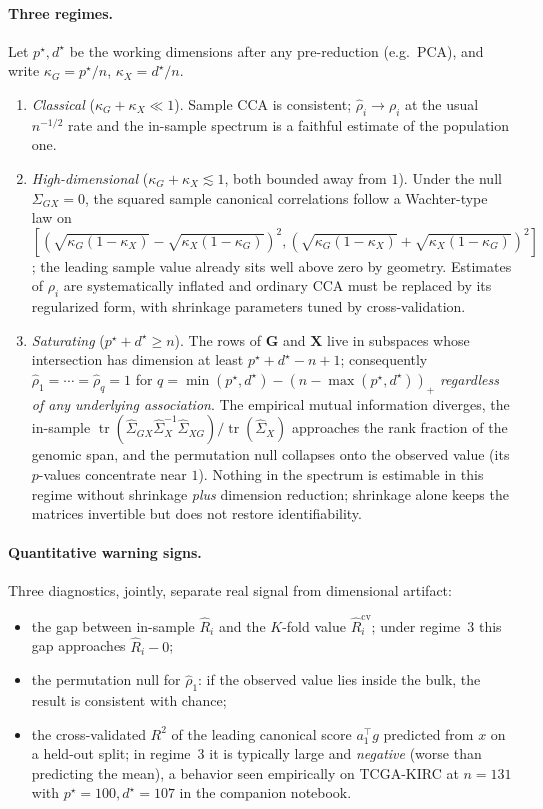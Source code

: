 \documentclass{article}
\newcommand{\tr}{\operatorname{tr}}
\newcommand{\Sx}{\Sigma_{X}}
\newcommand{\Sgx}{\Sigma_{GX}}
\newcommand{\Sxg}{\Sigma_{XG}}
\newcommand{\T}{^{\top}}
\begin{document}
\paragraph{Three regimes.} Let $p^\star, d^\star$ be the working dimensions
after any pre-reduction (e.g.\ PCA), and write $\kappa_G = p^\star/n$,
$\kappa_X = d^\star/n$.
\begin{enumerate}
\item \emph{Classical} ($\kappa_G + \kappa_X \ll 1$). Sample CCA is consistent;
$\hat\rho_i \to \rho_i$ at the usual $n^{-1/2}$ rate and the in-sample spectrum
is a faithful estimate of the population one.
\item \emph{High-dimensional} ($\kappa_G + \kappa_X \lesssim 1$, both bounded
away from $1$). Under the null $\Sgx = 0$, the squared sample canonical
correlations follow a Wachter-type law on
$[(\sqrt{\kappa_G(1-\kappa_X)} - \sqrt{\kappa_X(1-\kappa_G)})^2,
 (\sqrt{\kappa_G(1-\kappa_X)} + \sqrt{\kappa_X(1-\kappa_G)})^2]$
\citep{wachter1980limiting,yang2015independence}; the leading sample value already sits well
above zero by geometry. Estimates of $\rho_i$ are systematically inflated and
ordinary CCA must be replaced by its regularized form, with shrinkage
parameters tuned by cross-validation.
\item \emph{Saturating} ($p^\star + d^\star \ge n$). The rows of $\mathbf{G}$
and $\mathbf{X}$ live in subspaces whose intersection has dimension at least
$p^\star + d^\star - n + 1$; consequently
$\hat\rho_1 = \cdots = \hat\rho_q = 1$ for $q = \min(p^\star, d^\star) - (n -
\max(p^\star, d^\star))_+$ \emph{regardless of any underlying association}.
The empirical mutual information diverges, the in-sample
$\tr(\hat\Sgx \hat\Sx^{-1} \hat\Sxg)/\tr(\hat\Sx)$ approaches the rank fraction
of the genomic span, and the permutation null collapses onto the observed
value (its $p$-values concentrate near $1$). Nothing in the spectrum is
estimable in this regime without shrinkage \emph{plus} dimension reduction;
shrinkage alone keeps the matrices invertible but does not restore
identifiability.
\end{enumerate}

\paragraph{Quantitative warning signs.} Three diagnostics, jointly, separate
real signal from dimensional artifact:
\begin{itemize}
\item the gap between in-sample $\hat R_i$ and the $K$-fold value $\hat
R_i^{\mathrm{cv}}$; under regime~3 this gap approaches $\hat R_i - 0$;
\item the permutation null for $\hat\rho_1$: if the observed value lies inside
the bulk, the result is consistent with chance;
\item the cross-validated $R^2$ of the leading canonical score $a_1\T g$
predicted from $x$ on a held-out split; in regime~3 it is typically large and
\emph{negative} (worse than predicting the mean), a behavior seen empirically
on TCGA-KIRC at $n=131$ with $p^\star = 100, d^\star = 107$ in the companion
notebook.
\end{itemize}
\end{document}
